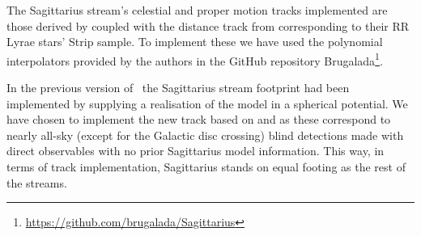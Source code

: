 The Sagittarius stream's celestial and proper motion tracks implemented are those derived by \citet{Antoja2020} coupled with the distance track from \citet{Ramos2020} corresponding to their RR Lyrae stars' Strip sample. To implement these we have used the polynomial interpolators provided by the authors in the GitHub repository Brugalada\footnote{\url{https://github.com/brugalada/Sagittarius}}.

In the previous version of \galstreams\ the Sagittarius stream footprint had been implemented by supplying a realisation of the \citet{LawMajewski2010} model in a spherical potential. We have chosen to implement the new track based on \citet{Antoja2020} and \citet{Ramos2020} as these correspond to nearly all-sky (except for the Galactic disc crossing) blind detections made with direct observables with no prior Sagittarius model information. This way, in terms of track implementation, Sagittarius stands on equal footing as the rest of the streams.
